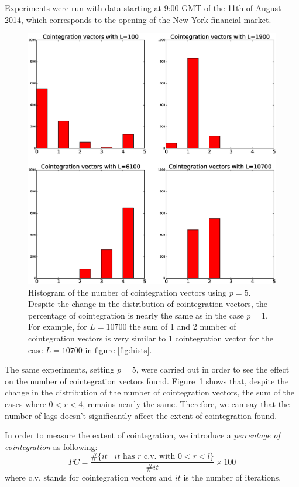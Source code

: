 Experiments were run with data starting at 9:00 GMT of the 11th of August 2014,
which corresponds to the opening of the New York financial market.


\begin{figure}[!h]
  \centering
  \includegraphics[width=\textwidth]{img/histCointVectorsp5}
  \caption{Histogram of the number of cointegration vectors using $p=5$. 
   Despite the change in the distribution of cointegration vectors, 
   the percentage of cointegration is nearly the same as in the case $p=1$. 
   For example, for $L=10700$ the sum of 1 and 2 number of cointegration
   vectors is very similar to 1 cointegration vector for the case $L=10700$
   in figure \ref{fig:hists}.}
   \label{fig:histsp5}
\end{figure}

The same experiments, setting $p=5$, were carried out in order to see the
effect on the number of cointegration vectors found. 
Figure~\ref{fig:histsp5} shows that, despite the change in the distribution
of the number of cointegration vectors, the sum of the cases where $0<r<4$,
remains nearly the same. 
Therefore, we can say that the number of lags doesn't significantly affect
the extent of cointegration found.

In order to measure the extent of cointegration, we introduce a
{\em percentage of cointegration\/} as following:
\begin{equation} \label{eq:pcoint}
PC = 
\frac{\#\{ it \mid \text{$it$ has $r$ c.v. with $0<r<l$}\}}
     {\#it}\times 100
\end{equation}
where c.v. stands for cointegration vectors and $it$ is the number of iterations.


